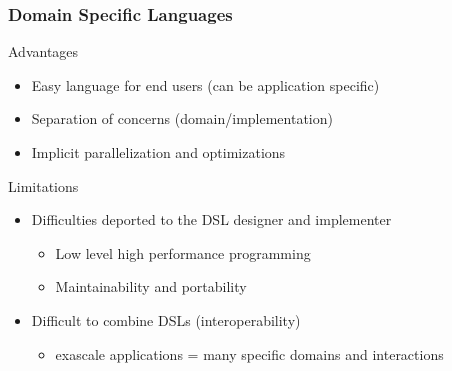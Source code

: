 \documentclass{beamer}
\begin{document}
\begin{frame}
  \frametitle{Domain Specific Languages} %
  \begin{block}{Advantages}
    \begin{itemize}
    \item Easy language for end users (can be application specific)
    \item Separation of concerns (domain/implementation)
    \item Implicit parallelization and optimizations
    \end{itemize}
  \end{block}
  \begin{alertblock}{Limitations}
    \begin{itemize}
    \item Difficulties deported to the DSL designer and implementer
      \begin{itemize}
      \item Low level high performance programming
      \item Maintainability and portability
      \end{itemize}
    \item Difficult to combine DSLs (interoperability)
      \begin{itemize}
      \item exascale applications = many specific domains and interactions
      \end{itemize}
    \end{itemize}
  \end{alertblock}
\end{frame}
\end{document}
